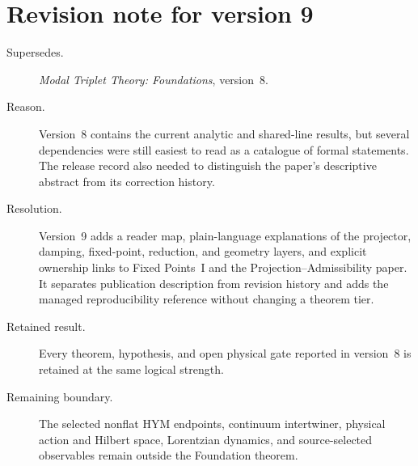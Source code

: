 \documentclass[11pt]{article}
\begin{document}
\section*{Revision note for version 9}
\begin{description}
\item[Supersedes.] \emph{Modal Triplet Theory: Foundations}, version~8.
\item[Reason.] Version~8 contains the current analytic and shared-line
results, but several dependencies were still easiest to read as a catalogue
of formal statements. The release record also needed to distinguish the
paper's descriptive abstract from its correction history.
\item[Resolution.] Version~9 adds a reader map, plain-language explanations
of the projector, damping, fixed-point, reduction, and geometry layers, and
explicit ownership links to Fixed Points~I and the
Projection--Admissibility paper. It separates publication description from
revision history and adds the managed reproducibility reference without
changing a theorem tier.
\item[Retained result.] Every theorem, hypothesis, and open physical gate
reported in version~8 is retained at the same logical strength.
\item[Remaining boundary.] The selected nonflat HYM endpoints, continuum
intertwiner, physical action and Hilbert space, Lorentzian dynamics, and
source-selected observables remain outside the Foundation theorem.
\end{description}
\end{document}
